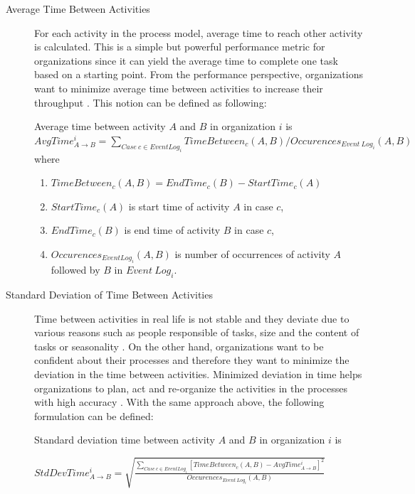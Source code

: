 \begin{description}
  \item[Average Time Between Activities] For each activity in the process model, average time to reach other activity is calculated. This is a simple but powerful performance metric for organizations since it can yield the average time to complete one task based on a starting point. From the performance perspective, organizations want to minimize average time between activities to increase their throughput \cite{van2012replaying}. This notion can be defined as following:
	\theoremstyle{definition}
	\begin{definition}{}
	Average time between activity $A$ and $B$ in organization $i$ is 
	$AvgTime_{A\rightarrow B}^{i} = \sum_{Case\ c \in Event Log_{i}} TimeBetween_{c}(A,B) / Occurences_{Event\ Log_{i}}(A,B)$ where
		\begin{enumerate}
			\item $TimeBetween_{c}(A, B) = EndTime_{c}(B) - StartTime_{c}(A)$
			\item $StartTime_{c}(A)$ is start time of activity $A$ in case $c$,
			\item $EndTime_{c}(B)$ is end time of activity $B$ in case $c$,
			\item $Occurences_{Event Log_{i}}(A, B)$ is number of occurrences of  activity $A$ followed by $B$ in  $Event\ Log_{i}$.
		\end{enumerate}
	\end{definition}

	\item[Standard Deviation of Time Between Activities] Time between activities in real life is not stable and they deviate due to various reasons such as people responsible of tasks, size and the content of tasks or seasonality \cite{van2011process}. On the other hand, organizations want to be confident about their processes and therefore they want to minimize the deviation in the time between activities. Minimized deviation in time helps organizations to plan, act and re-organize the activities in the processes with high accuracy \cite{van2012replaying}. With the same approach above, the following formulation can be defined:
	\theoremstyle{definition}
	\begin{definition}{}
	Standard deviation time between activity $A$ and $B$ in organization $i$ is 

	$StdDevTime_{A\rightarrow B}^{i} = \sqrt{\frac{\sum_{Case\ c \in Event Log_{i}} [TimeBetween_{c}(A, B) - AvgTime_{A\rightarrow B}^{i}]^{2}}{Occurences_{Event\ Log_{i}}(A,B)} }$ 
	\end{definition}
\end{description}

